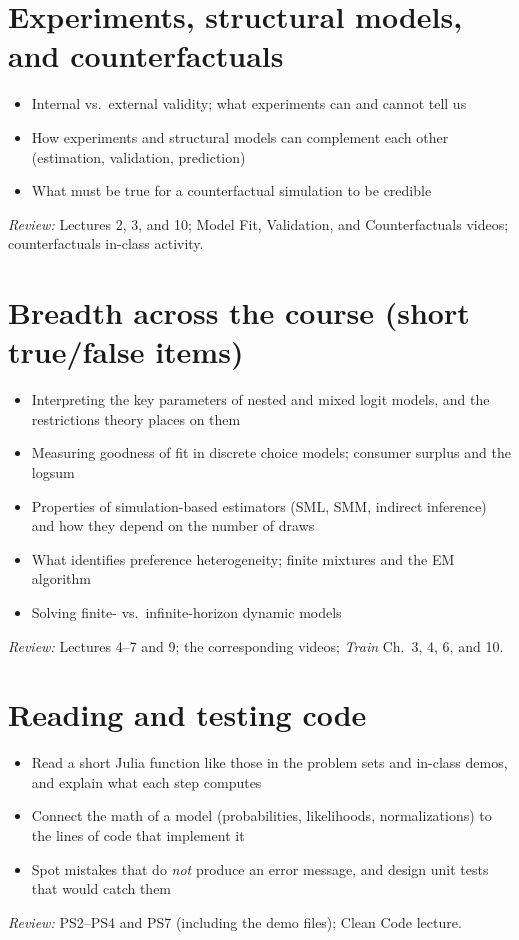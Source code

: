 \documentclass[11pt]{article}
\newcommand{\review}[1]{\par\smallskip\textit{Review:} #1}
\begin{document}
\section{Experiments, structural models, and counterfactuals}
\begin{itemize}
\item Internal vs.\ external validity; what experiments can and cannot tell us
\item How experiments and structural models can complement each other (estimation, validation, prediction)
\item What must be true for a counterfactual simulation to be credible
\end{itemize}
\review{Lectures 2, 3, and 10; Model Fit, Validation, and Counterfactuals videos; counterfactuals in-class activity.}

\section{Breadth across the course (short true/false items)}
\begin{itemize}
\item Interpreting the key parameters of nested and mixed logit models, and the restrictions theory places on them
\item Measuring goodness of fit in discrete choice models; consumer surplus and the logsum
\item Properties of simulation-based estimators (SML, SMM, indirect inference) and how they depend on the number of draws
\item What identifies preference heterogeneity; finite mixtures and the EM algorithm
\item Solving finite- vs.\ infinite-horizon dynamic models
\end{itemize}
\review{Lectures 4--7 and 9; the corresponding videos; \emph{Train} Ch.\ 3, 4, 6, and 10.}

\section{Reading and testing code}
\begin{itemize}
\item Read a short Julia function like those in the problem sets and in-class demos, and explain what each step computes
\item Connect the math of a model (probabilities, likelihoods, normalizations) to the lines of code that implement it
\item Spot mistakes that do \emph{not} produce an error message, and design unit tests that would catch them
\end{itemize}
\review{PS2--PS4 and PS7 (including the demo files); Clean Code lecture.}
\end{document}
